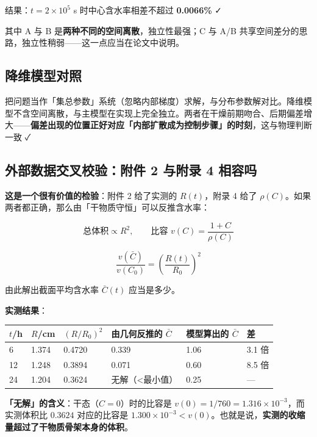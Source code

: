 结果：$t=2\times10^5$ s 时中心含水率相差不超过 \textbf{0.0066\%} ✓


其中 A 与 B 是\textbf{两种不同的空间离散}，独立性最强；C 与 A/B 共享空间差分的思路，独立性稍弱——这一点应当在论文中说明。


\subsection{降维模型对照}


把问题当作「集总参数」系统（忽略内部梯度）求解，与分布参数解对比。降维模型不含空间离散，与主模型在实现上完全独立。两者在干燥前期吻合、后期偏差增大——\textbf{偏差出现的位置正好对应「内部扩散成为控制步骤」的时刻}，这与物理判断一致 ✓


\subsection{外部数据交叉校验：附件 2 与附录 4 相容吗}


\textbf{这是一个很有价值的检验}：附件 2 给了实测的 $R(t)$，附录 4 给了 $\rho(C)$。如果两者都正确，那么由「干物质守恒」可以反推含水率：


\begin{equation*}
\text{总体积}\propto R^2,\qquad \text{比容 }v(C)=\frac{1+C}{\rho(C)}
\end{equation*}


\begin{equation}
\frac{v(\bar C)}{v(C_0)}=\left(\frac{R(t)}{R_0}\right)^2\tag{11.1}
\end{equation}


由此解出截面平均含水率 $\bar C(t)$ 应当是多少。


\textbf{实测结果}：


\begin{center}
\small
\begin{tabular}{llllll}
\toprule
$t$/h & $R$/cm & $(R/R_0)^2$ & 由几何反推的 $\bar C$ & 模型算出的 $\bar C$ & 差 \\
\midrule
6 & 1.374 & 0.4720 & 0.339 & 1.06 & 3.1 倍 \\
12 & 1.248 & 0.3894 & 0.071 & 0.60 & 8.5 倍 \\
24 & 1.204 & 0.3624 & 无解（<最小值） & 0.25 & — \\
\bottomrule
\end{tabular}
\end{center}


\textbf{「无解」的含义}：干态（$C=0$）时的比容是 $v(0)=1/760=1.316\times10^{-3}$，而实测体积比 $0.3624$ 对应的比容是 $1.300\times10^{-3}<v(0)$。也就是说，\textbf{实测的收缩量超过了干物质骨架本身的体积}。


